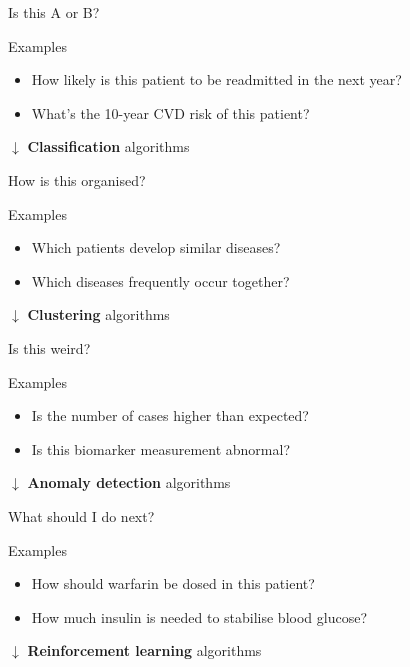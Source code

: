 \begin{frame}{Is this A or B?}
    \begin{block}{Examples}
        \begin{itemize}
            \item How likely is this patient to be readmitted in the next year?
            \item What's the 10\hyp{}year CVD risk of this patient?
        \end{itemize}
    \end{block}
    \begin{center}
        \large%
        $\downarrow$
        \vfill
        \textbf{Classification} algorithms
    \end{center}
\end{frame}

\begin{frame}{How is this organised?}
    \begin{block}{Examples}
        \begin{itemize}
            \item Which patients develop similar diseases?
            \item Which diseases frequently occur together?
        \end{itemize}
    \end{block}
    \begin{center}
        \large%
        $\downarrow$
        \vfill
        \textbf{Clustering} algorithms
    \end{center}
\end{frame}

\begin{frame}{Is this weird?}
    \begin{block}{Examples}
        \begin{itemize}
            \item Is the number of cases higher than expected?
            \item Is this biomarker measurement abnormal?
        \end{itemize}
    \end{block}
    \begin{center}
        \large%
        $\downarrow$
        \vfill
        \textbf{Anomaly detection} algorithms
    \end{center}
\end{frame}

\begin{frame}{What should I do next?}
    \begin{block}{Examples}
        \begin{itemize}
            \item How should warfarin be dosed in this patient?
            \item How much insulin is needed to stabilise blood glucose?
        \end{itemize}
    \end{block}
    \begin{center}
        \large%
        $\downarrow$
        \vfill
        \textbf{Reinforcement learning} algorithms
    \end{center}
\end{frame}

